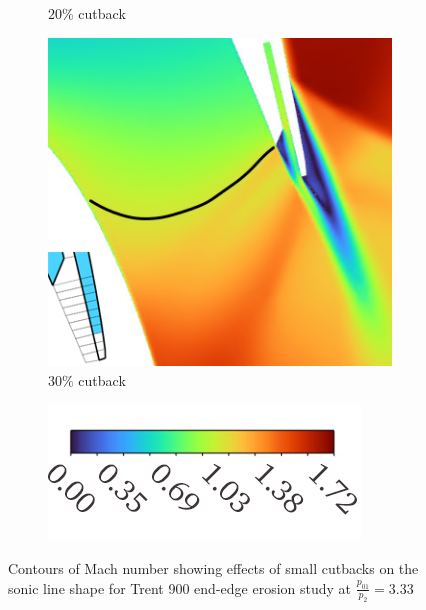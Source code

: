 \documentclass[a4paper, 11pt, oneside]{report}
\begin{document}
\begin{figure}[H]
\begin{subfigure}{.42\textwidth}
		\caption{$20\%$ cutback}
	\end{subfigure}
	\hspace{0.05\textwidth}
	\begin{subfigure}{.42\textwidth}
		\centering
		\includegraphics[width=\linewidth]{figs/ss_cutbacks_m1_lines_3.png}
		\caption{$30\%$ cutback}
	\end{subfigure}
	\begin{subfigure}{.4\textwidth}
		\centering
		\includegraphics[width=\linewidth]{figs/mach_legend_choked_horizontal.png}
	\end{subfigure}
	\caption{Contours of Mach number showing effects of small cutbacks on the sonic line shape for Trent 900 end-edge erosion study at $\frac{p_{01}}{p_2}=3.33$}
	\label{fig:ss_cutbacks_0-3}
\end{figure}
\end{document}
